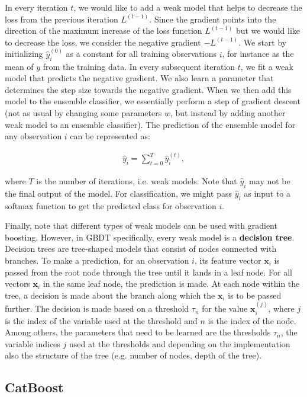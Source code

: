 \documentclass{article}
\begin{document}
	In every iteration $t$, we would like to add a weak model that helps to decrease the loss from the previous iteration $L^{(t-1)}$. Since the gradient points into the direction of the maximum increase of the loss function $L^{(t-1)}$ but we would like to decrease the loss, we consider the negative gradient $-L^{(t-1)}$.
	We start by initializing $\hat{y}_i^{(0)}$ as a constant for all training observations $i$, for instance as the mean of $y$ from the training data. In every subsequent iteration $t$, we fit a weak model that predicts the negative gradient. We also learn a parameter that determines the step size towards the negative gradient. When we then add this model to the ensemble classifier, we essentially perform a step of gradient descent (not as usual by changing some parameters $w$, but instead by adding another weak model to an ensemble classifier). The prediction of the ensemble model for any observation $i$ can be represented as:
	
	\begin{align}
	 \hat{y}_i = \sum_{t = 0}^T \hat{y}_i^{(t)}, 
	\end{align}
	
	where $T$ is the number of iterations, i.e. weak models. Note that $\hat{y}_i$ may not be the final output of the model. For classification, we might pass $\hat{y}_i$ as input to a softmax function to get the predicted class for observation $i$.
	
	Finally, note that different types of weak models can be used with gradient boosting. However, in GBDT specifically, every weak model is a \textbf{decision tree}. Decision trees are tree-shaped models that consist of nodes connected with branches. To make a prediction, for an observation $i$, its feature vector $\textbf{x}_i$ is passed from the root node through the tree until it lands in a leaf node. For all vectors $\textbf{x}_i$ in the same leaf node, the prediction is made. At each node within the tree, a decision is made about the branch along which the $\textbf{x}_i$ is to be passed further. The decision is made based on a threshold $\tau_n$ for the value $\textbf{x}_{i}^{(j)}$, where $j$ is the index of the variable used at the threshold and $n$ is the index of the node. Among others, the parameters that need to be learned are the thresholds $\tau_n$, the variable indices $j$ used at the thresholds and depending on the implementation also the structure of the tree (e.g. number of nodes, depth of the tree).


	\subsection{CatBoost}
	
\end{document}
